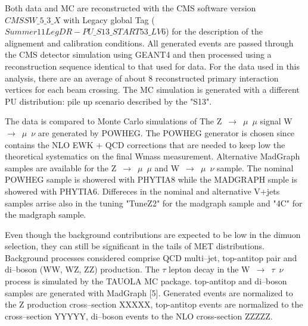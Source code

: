 \documentclass[41pt,a4paper,oneside]{report}
\begin{document}
 Both data and MC are reconstructed with the CMS software
version $CMSSW\_5\_3\_X$ with Legacy global Tag ($Summer11LegDR-PU\_S13\_START53\_LV6$) for the description of the alignement and calibration conditions.
All generated events are passed through the CMS detector simulation using GEANT4 
and then processed using a reconstruction sequence identical to that used for data.
For the data used in this analysis, there are an average of about 8 reconstructed primary
interaction vertices for each beam crossing. The MC simulation is generated with a different
PU distribution: pile up scenario described by the "S13".

The data is compared to Monte Carlo simulations of 
The Z~$\rightarrow$~$\mu$~$\mu$ signal W~$\rightarrow$~$\mu$~$\nu$ are generated by POWHEG.
The POWHEG generator is chosen since contains the NLO EWK + QCD corrections that are needed to keep low the theoretical systematics on the final Wmass measurement.
Alternative MadGraph samples are available for the Z~$\rightarrow$~$\mu$~$\mu$ and W~$\rightarrow$~$\mu$~$\nu$ sample.
The nominal POWHEG sample is showered with PHYTIA8 while the MADGRAPH smple is showered with PHYTIA6.
Differeces in the nominal and alternative V+jets samples arrise also in the tuning "TuneZ2" for the madgraph sample and "4C" for the madgraph sample.

Even though the background contributions are expected to be low in the dimuon selection, they can still be
significant in the tails of MET distributions. Background processes considered comprise 
QCD multi–jet, top-antitop pair and di–boson (WW, WZ, ZZ) production. 
The $\tau$ lepton decay in the W~$\rightarrow$~$\tau$~$\nu$  process is simulated by the TAUOLA MC package.
top-antitop and di–boson samples are generated with MadGraph [5]. 
Generated events are normalized to the Z production cross–section XXXXX,
top-antitop events are normalized to the cross–section YYYYY, di–boson events to the NLO cross-section ZZZZZ.


\end{document}
